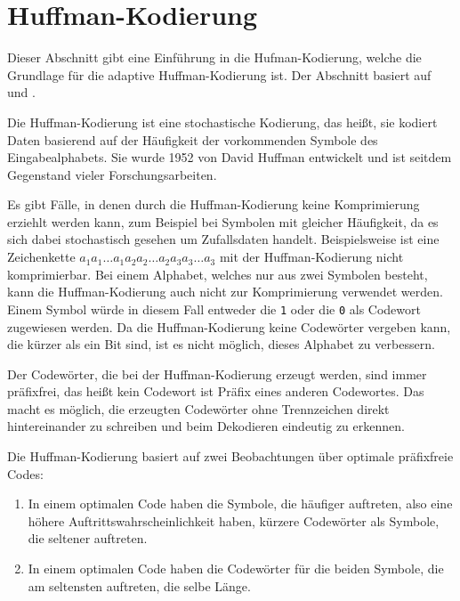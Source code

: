 \documentclass[twoside,11pt,a4paper]{article}
\theoremstyle{break}
\begin{document}

\section{Huffman-Kodierung} \label{sec:huffman}
Dieser Abschnitt gibt eine Einführung in die Hufman-Kodierung, welche
die Grundlage für die adaptive Huffman-Kodierung ist. Der Abschnitt
basiert auf \cite{Salomon:2010} und \cite{Sayood:2006}.

Die Huffman-Kodierung ist eine stochastische Kodierung, das heißt, sie
kodiert Daten basierend auf der Häufigkeit der vorkommenden Symbole
des Eingabealphabets. Sie wurde 1952 von David Huffman entwickelt und
ist seitdem Gegenstand vieler Forschungsarbeiten.

Es gibt Fälle, in denen durch die Huffman-Kodierung keine
Komprimierung erziehlt werden kann, zum Beispiel bei Symbolen mit
gleicher Häufigkeit, da es sich dabei stochastisch gesehen um
Zufallsdaten handelt. Beispielsweise ist eine Zeichenkette
$a_1a_1{\dots}a_1a_2a_2{\dots}a_2a_3a_3{\dots}a_3$ mit der
Huffman-Kodierung nicht komprimierbar. Bei einem Alphabet, welches nur
aus zwei Symbolen besteht, kann die Huffman-Kodierung auch nicht zur
Komprimierung verwendet werden. Einem Symbol würde in diesem Fall
entweder die {\tt1} oder die {\tt0} als Codewort zugewiesen werden.
Da die Huffman-Kodierung keine Codewörter vergeben kann, die kürzer
als ein Bit sind, ist es nicht möglich, dieses Alphabet zu verbessern.

Der Codewörter, die bei der Huffman-Kodierung erzeugt werden, sind
immer präfixfrei, das heißt kein Codewort ist Präfix eines anderen
Codewortes. Das macht es möglich, die erzeugten Codewörter ohne
Trennzeichen direkt hintereinander zu schreiben und beim Dekodieren
eindeutig zu erkennen.

Die Huffman-Kodierung basiert auf zwei Beobachtungen über optimale
präfixfreie Codes:

\begin{enumerate}
\item In einem optimalen Code haben die Symbole, die häufiger
  auftreten, also eine höhere Auftrittswahrscheinlichkeit haben,
  kürzere Codewörter als Symbole, die seltener auftreten.
\item In einem optimalen Code haben die Codewörter für die beiden
  Symbole, die am seltensten auftreten, die selbe Länge.
\end{enumerate}
\end{document}
